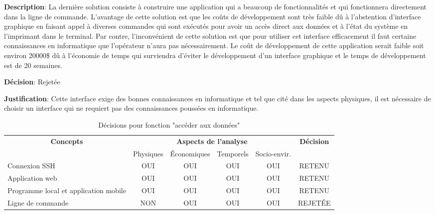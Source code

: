\textbf{Description}:
La dernière solution consiste à construire une application qui a beaucoup de fonctionnalités et qui fonctionnera directement dans la ligne de commande. L’avantage de cette solution est que les coûts de développement sont très faible dû à l’abstention d’interface graphique en faisant appel à diverses commandes qui sont exécutés pour avoir un accès direct aux données et à l’état du système en l’imprimant dans le terminal. Par contre, l’inconvénient de cette solution est que pour utiliser cet interface efficacement il faut certaine connaissances en informatique que l’opérateur n’aura pas nécessairement. Le coût de développement de cette application serait faible soit environ 20000\$ dû à l’économie de temps qui surviendra d’éviter le développement d’un interface graphique et le temps de développement est de 20 semaines.

\textbf{Décision}: Rejetée

\textbf{Justification}: Cette interface exige des bonnes connaissances en informatique et tel que cité dans les aspects physiques, il est nécessaire de choisir un interface qui ne requiert pas des connaissances poussées en informatique.

\begin{table}[!htbp]
	\begin{tabular}{|l|c|c|c|c|c|}
		\hline
		\multicolumn{1}{|c|}{\multirow{2}{*}{\textbf{Concepts}}} & \multicolumn{4}{c|}{\textbf{Aspects de l'analyse}} & \multirow{2}{*}{\textbf{Décision}} \\ \cline{2-5}
		\multicolumn{1}{|c|}{}                                   & Physiques & Économiques & Temporels & Socio-envir. &                                    \\ \hline
		Connexion SSH                                                  & OUI       & OUI         & OUI       & OUI          & RETENU                             \\ \hline
		Application web                                                 & OUI       & OUI         & OUI       & OUI          & RETENU                             \\ \hline
		Programme local et application mobile                                                & OUI       & OUI         & OUI       & OUI          & RETENU                             \\ \hline
		Ligne de commande                                                 & NON       & OUI         & OUI       & OUI          & REJETÉE	        \\ \hline
	\end{tabular}
	\caption{Décisions pour fonction "accéder aux données"}
	\label{tab:fct_acceder}
\end{table}
